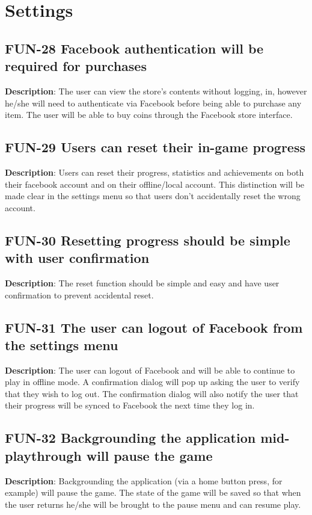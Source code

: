 \section{Settings}

\subsection{FUN-28 Facebook authentication will be required for purchases}
\textbf{Description}: The user can view the store\textquoteright{}s
contents without logging, in, however he/she will need to authenticate
via Facebook before being able to purchase any item. The user will
be able to buy coins through the Facebook store interface.

\subsection{FUN-29 Users can reset their in-game progress}
\textbf{Description}: Users can reset their progress, statistics and
achievements on both their facebook account and on their offline/local
account. This distinction will be made clear in the settings menu
so that users don\textquoteright{}t accidentally reset the wrong account.

\subsection{FUN-30 Resetting progress should be simple with user confirmation}
\textbf{Description}: The reset function should be simple and easy
and have user confirmation to prevent accidental reset.

\subsection{FUN-31 The user can logout of Facebook from the settings menu}
\textbf{Description}: The user can logout of Facebook and will be
able to continue to play in offline mode. A confirmation dialog will
pop up asking the user to verify that they wish to log out. The confirmation
dialog will also notify the user that their progress will be synced
to Facebook the next time they log in.

\subsection{FUN-32 Backgrounding the application mid-playthrough will pause
the game}
\textbf{Description}: Backgrounding the application (via a home button
press, for example) will pause the game. The state of the game will
be saved so that when the user returns he/she will be brought to the
pause menu and can resume play.

